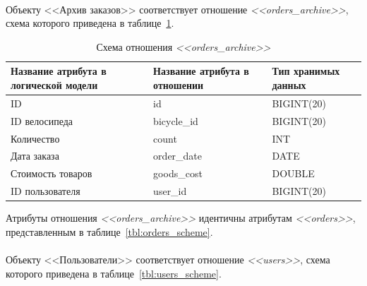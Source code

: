 \paragraph{}
Объекту <<Архив заказов>> соответствует отношение \textit{<<orders\_archive>>}, схема которого приведена в
таблице~\ref{tbl:orders_archive_scheme}.
\begin{table}[h!]
  \caption{Схема отношения \textit{<<orders\_archive>>}}
  \label{tbl:orders_archive_scheme}
  \small{
    \centering
    \begin{tabular}{| p{} | p{} | p{} |}
      \hline
      Название атрибута в \newline логической модели &
      Название атрибута в \newline отношении &
      Тип хранимых данных \\

      \hline
      ID & id & BIGINT(20) \\

      \hline
      ID велосипеда & bicycle\_id & BIGINT(20) \\

      \hline
      Количество & count & INT \\

      \hline
      Дата заказа & order\_date & DATE \\

      \hline
      Стоимость товаров & goods\_cost & DOUBLE \\

      \hline
      ID пользователя & user\_id & BIGINT(20) \\

      \hline
    \end{tabular}
    }
\end{table}

Атрибуты отношения \textit{<<orders\_archive>>} идентичны атрибутам
\textit{<<orders>>}, представленным в таблице~\ref{tbl:orders_scheme}.

\paragraph{}

Объекту <<Пользователи>> соответствует отношение \textit{<<users>>}, схема которого приведена в
таблице~\ref{tbl:users_scheme}.

